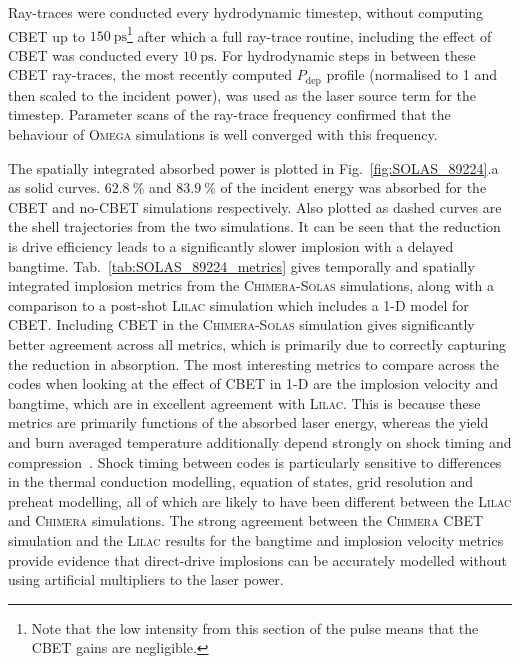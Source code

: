 Ray-traces were conducted every hydrodynamic timestep, without computing \ac{CBET} up to $150\ \text{ps}$\footnote{Note that the low intensity from this section of the pulse means that the \ac{CBET} gains are negligible.} after which a full ray-trace routine, including the effect of \ac{CBET} was conducted every $10\ \text{ps}$.
For hydrodynamic steps in between these \ac{CBET} ray-traces, the most recently computed $P_{\text{dep}}$ profile (normalised to 1 and then scaled to the incident power), was used as the laser source term for the timestep.
Parameter scans of the ray-trace frequency confirmed that the behaviour of \textsc{Omega} simulations is well converged with this frequency.

The spatially integrated absorbed power is plotted in Fig.~\ref{fig:SOLAS_89224}.a as solid curves.
$62.8\ \%$ and $83.9\ \%$ of the incident energy was absorbed for the \ac{CBET} and no-\ac{CBET} simulations respectively.
Also plotted as dashed curves are the shell trajectories from the two simulations.
It can be seen that the reduction is drive efficiency leads to a significantly slower implosion with a delayed bangtime.
Tab.~\ref{tab:SOLAS_89224_metrics} gives temporally and spatially integrated implosion metrics from the \textsc{Chimera}-\textsc{Solas} simulations, along with a comparison to a post-shot \textsc{Lilac} simulation which includes a 1-D model for \ac{CBET}.
Including \ac{CBET} in the \textsc{Chimera}-\textsc{Solas} simulation gives significantly better agreement across all metrics, which is primarily due to correctly capturing the reduction in absorption.
The most interesting metrics to compare across the codes when looking at the effect of \ac{CBET} in 1-D are the implosion velocity and bangtime, which are in excellent agreement with \textsc{Lilac}.
This is because these metrics are primarily functions of the absorbed laser energy, whereas the yield and burn averaged temperature additionally depend strongly on shock timing and compression~\cite{zhou_hydrodynamic_2007,trickey_physics_2024}.
Shock timing between codes is particularly sensitive to differences in the thermal conduction modelling, equation of states, grid resolution and preheat modelling, all of which are likely to have been different between the \textsc{Lilac} and \textsc{Chimera} simulations.
The strong agreement between the \textsc{Chimera} \ac{CBET} simulation and the \textsc{Lilac} results for the bangtime and implosion velocity metrics provide evidence that direct-drive implosions can be accurately modelled without using artificial multipliers to the laser power.

